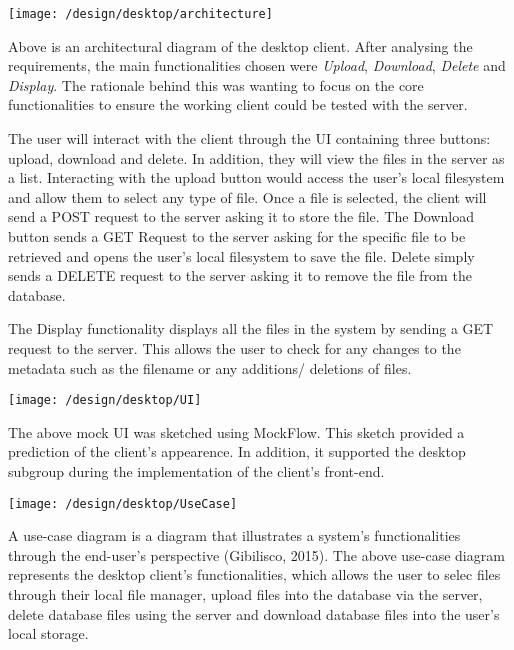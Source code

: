 \documentclass{article}
\begin{document}
\texttt{[image: /design/desktop/architecture]}

Above is an architectural diagram of the desktop client. After analysing the requirements, the main functionalities chosen were \textit{Upload}, \textit{Download}, \textit{Delete} and \textit{Display}. The rationale behind this was wanting to focus on the core functionalities to ensure the working client could be tested with the server.

The user will interact with the client through the UI containing three buttons: upload, download and delete. In addition, they will view the files in the server as a list. Interacting with the upload button would access the user’s local filesystem and allow them to select any type of file. Once a file is selected, the client will send a POST request to the server asking it to store the file. The Download button sends a GET Request to the server asking for the specific file to be retrieved and opens the user’s local filesystem to save the file. Delete simply sends a DELETE request to the server asking it to remove the file from the database.

The Display functionality displays all the files in the system by sending a GET request to the server. This allows the user to check for any changes to the metadata such as the filename or any additions/ deletions of files.

\texttt{[image: /design/desktop/UI]}

The above mock UI was sketched using MockFlow. This sketch provided a prediction of the client's appearence. In addition, it supported the desktop subgroup during the implementation of the client's front-end. 

\texttt{[image: /design/desktop/UseCase]}

A use-case diagram is a diagram that illustrates a system's functionalities through the end-user's perspective (Gibilisco, 2015). The above use-case diagram represents the desktop client's functionalities, which allows the user to selec files through their local file manager, upload files into the database via the server, delete database files using the server and download database files into the user's local storage.
\end{document}

